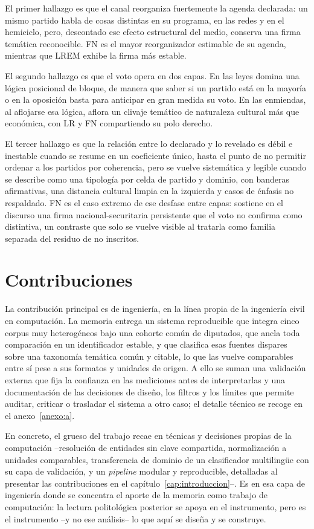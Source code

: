 El primer hallazgo es que el canal reorganiza fuertemente la agenda declarada:
un mismo partido habla de cosas distintas en su programa, en las redes y en el
hemiciclo, pero, descontado ese efecto estructural del medio, conserva una firma
temática reconocible. FN es el mayor reorganizador estimable de su agenda,
mientras que LREM exhibe la firma más estable.

El segundo hallazgo es que el voto opera en dos capas. En las leyes domina una
lógica posicional de bloque, de manera que saber si un partido está en la mayoría
o en la oposición basta para anticipar en gran medida su voto. En las enmiendas,
al aflojarse esa lógica, aflora un clivaje temático de naturaleza cultural más
que económica, con LR y FN compartiendo su polo derecho.

El tercer hallazgo es que la relación entre lo declarado y lo revelado es débil e
inestable cuando se resume en un coeficiente único, hasta el punto de no permitir
ordenar a los partidos por coherencia, pero se vuelve sistemática y legible cuando
se describe como una tipología por celda de partido y dominio, con banderas
afirmativas, una distancia cultural limpia en la izquierda y casos de énfasis no
respaldado. FN es el caso extremo de ese desfase entre capas: sostiene en el
discurso una firma nacional-securitaria persistente que el voto no confirma como
distintiva, un contraste que solo se vuelve visible al tratarla como familia
separada del residuo de no inscritos.

\section{Contribuciones}
\label{sec:concl-contribuciones}

La contribución principal es de ingeniería, en la línea propia de la ingeniería
civil en computación. La memoria entrega un sistema reproducible que integra
cinco corpus muy heterogéneos bajo una cohorte común de diputados, que ancla toda
comparación en un identificador estable, y que clasifica esas fuentes dispares
sobre una taxonomía temática común y citable, lo que las vuelve comparables entre
sí pese a sus formatos y unidades de origen. A ello se suman una validación
externa que fija la confianza en las mediciones antes de interpretarlas y una
documentación de las decisiones de diseño, los filtros y los límites que permite
auditar, criticar o trasladar el sistema a otro caso; el detalle técnico se
recoge en el anexo~\ref{anexo:a}.

En concreto, el grueso del trabajo recae en técnicas y decisiones propias de la
computación --resolución de entidades sin clave compartida, normalización a
unidades comparables, transferencia de dominio de un clasificador multilingüe con
su capa de validación, y un \emph{pipeline} modular y reproducible, detalladas al
presentar las contribuciones en el capítulo~\ref{cap:introduccion}--. Es en esa
capa de ingeniería donde se concentra el aporte de la memoria como trabajo de
computación: la lectura politológica posterior se apoya en el instrumento, pero es
el instrumento --y no ese análisis-- lo que aquí se diseña y se construye.

